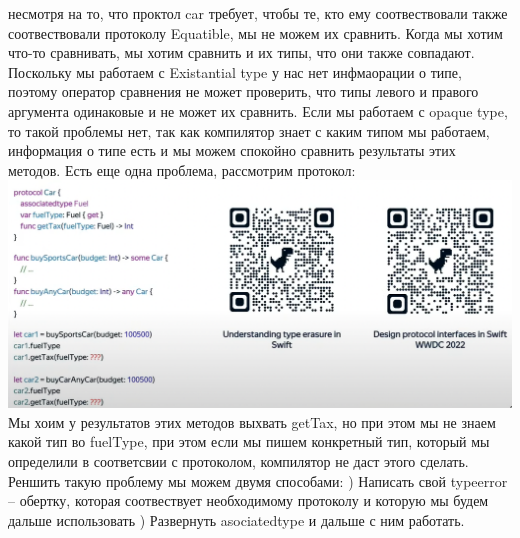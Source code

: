 \documentclass{article}
\begin{document}
    несмотря на то, что проктол car требует, чтобы те, кто ему соотвествовали также соотвествовали протоколу Equatible, мы не можем их сравнить. 
    \newline
    Когда мы хотим что-то сравнивать, мы хотим сравнить и их типы, что они также совпадают. Поскольку мы работаем с Existantial type у нас нет инфмаорации о типе, поэтому оператор сравнения не может проверить, что типы левого и правого аргумента одинаковые и не может их сравнить. 
    \newline
    Если мы работаем с opaque type, то такой проблемы нет, так как компилятор знает с каким типом мы работаем, информация о типе есть и мы можем спокойно сравнить результаты этих методов. 
    \newline
    \newline
    Есть еще одна проблема, рассмотрим протокол: 
    \newline
    \includegraphics[scale = 0.5]{pic/Снимок экрана 2023-07-28 в 23.19.06.png}
    \newline
    Мы хоим у результатов этих методов выхвать getTax, но при этом мы не знаем какой тип во fuelType, при этом если мы пишем конкретный тип, который мы определили в соответсвии с протоколом, компилятор не даст этого сделать. 
    \newline
    Реншить такую проблему мы можем двумя способами: 
    ) Написать свой typeerror -- обертку, которая соотвествует необходимому протоколу и которую мы будем дальше использовать
    ) Развернуть asociatedtype и дальше с ним работать. 
\end{document}
